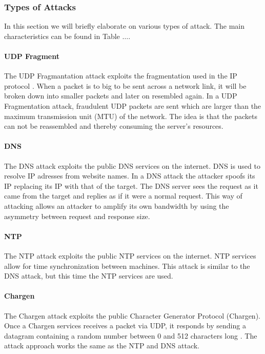 \subsubsection{Types of Attacks}
In this section we will briefly elaborate on various types of attack. The main characteristics can be found in Table $\dots$.

\paragraph{UDP Fragment}
The UDP Fragmantation attack exploits the fragmentation used in the IP protocol \cite{imperva}. When a packet is to big to be sent across a network link, it will be broken down into smaller packets and later on resembled again. In a UDP Fragmentation attack, fraudulent UDP packets are sent which are larger than the maximum transmission unit (MTU) of the network. The idea is that the packets can not be reassembled and thereby consuming the server's resources. 

\paragraph{DNS}
The DNS attack exploits the public DNS services on the internet. DNS is used to resolve IP adresses from website names. In a DNS attack the attacker spoofs its IP replacing its IP with that of the target. The DNS server sees the request as it came from the target and replies as if it were a normal request. This way of attacking allows an attacker to amplify its own bandwidth by using the asymmetry between request and response size. 

\paragraph{NTP}
The NTP attack exploits the public NTP services on the internet. NTP services allow for time synchronization between machines. This attack is similar to the DNS attack, but this time the NTP services are used. 

\paragraph{Chargen}
The Chargen attack exploits the public Character Generator Protocol (Chargen). Once a Chargen services receives a packet via UDP, it responds by sending a datagram containing a random number between 0 and 512 characters long \cite{ietf1983}. The attack approach works the same as the NTP and DNS attack.  






